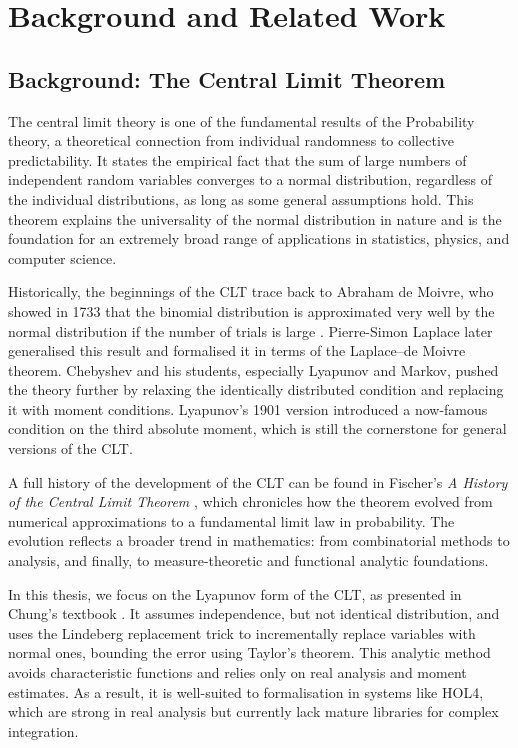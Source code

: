 \chapter{Background and Related Work}
\label{chap:2}

\section{Background: The Central Limit Theorem}

The central limit theory is one of the fundamental results of the Probability theory, a theoretical connection from individual randomness to collective predictability. It states the empirical fact that the sum of large numbers of independent random variables converges to a normal distribution, regardless of the individual distributions, as long as some general assumptions hold. This theorem explains the universality of the normal distribution in nature and is the foundation for an extremely broad range of applications in statistics, physics, and computer science.

Historically, the beginnings of the CLT trace back to Abraham de Moivre, who showed in 1733 that the binomial distribution is approximated very well by the normal distribution if the number of trials is large \cite{fischer2011history}. Pierre-Simon Laplace later generalised this result and formalised it in terms of the Laplace–de Moivre theorem. Chebyshev and his students, especially Lyapunov and Markov, pushed the theory further by relaxing the identically distributed condition and replacing it with moment conditions. Lyapunov’s 1901 version introduced a now-famous condition on the third absolute moment, which is still the cornerstone for general versions of the CLT.

A full history of the development of the CLT can be found in Fischer’s \emph{A History of the Central Limit Theorem} \cite{fischer2011history}, which chronicles how the theorem evolved from numerical approximations to a fundamental limit law in probability. The evolution reflects a broader trend in mathematics: from combinatorial methods to analysis, and finally, to measure-theoretic and functional analytic foundations.

In this thesis, we focus on the Lyapunov form of the CLT, as presented in Chung’s textbook \cite{Chung:2001}. It assumes independence, but not identical distribution, and uses the Lindeberg replacement trick to incrementally replace variables with normal ones, bounding the error using Taylor's theorem. This analytic method avoids characteristic functions and relies only on real analysis and moment estimates. As a result, it is well-suited to formalisation in systems like HOL4, which are strong in real analysis but currently lack mature libraries for complex integration.


